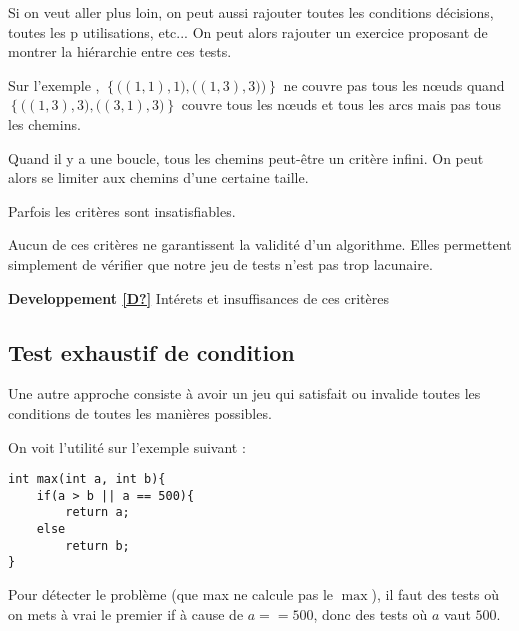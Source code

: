 \begin{com}
	Si on veut aller plus loin, on peut aussi rajouter toutes les conditions décisions, toutes les p utilisations, etc... On peut alors rajouter un exercice proposant de montrer la hiérarchie entre ces tests.
\end{com}

\begin{example}
	Sur l'exemple \label{3-1}, $\left\{ \big( (1,1), 1\big), \big((1,3), 3)\big)\right\} $ ne couvre pas tous les nœuds quand $\left\{ \big((1,3), 3), \big( (3, 1), 3 \big) \right\}$ couvre tous les nœuds et tous les arcs mais pas tous les chemins.
\end{example}

\begin{rem}
	Quand il y a une boucle, tous les chemins peut-être un critère infini. On peut alors se limiter aux chemins d'une certaine taille.
\end{rem}

\begin{rem}
	Parfois les critères sont insatisfiables.
\end{rem}

\begin{rem}
	Aucun de ces critères ne garantissent la validité d'un algorithme. Elles permettent simplement de vérifier que notre jeu de tests n'est pas trop lacunaire.
\end{rem}

\noindent \textbf{Developpement \ref{D?}} Intérets et insuffisances de ces critères

\subsection{Test exhaustif de condition}

\begin{idee}
	Une autre approche consiste à avoir un jeu qui satisfait ou invalide toutes les conditions de toutes les manières possibles.
\end{idee}

\begin{example}
	On voit l'utilité sur l'exemple suivant :\\
	\begin{minipage}{0.5\linewidth}
		\begin{lstlisting}[style=CStyle]
int max(int a, int b){
	if(a > b || a == 500){
        return a;
    else
        return b;
}
\end{lstlisting}
	\end{minipage}
	\begin{minipage}{0.5\linewidth}
		Pour détecter le problème (que max ne calcule pas le $\max$), il faut des tests où on mets à vrai le premier if à cause de $a == 500$, donc des tests où $a$ vaut $500$.
	\end{minipage}
\end{example}

